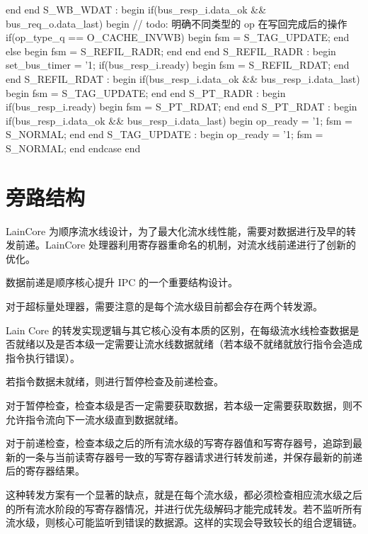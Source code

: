 \begin{CodeBlock}[language=BookSystemVerilog]
        end
      end
      S_WB_WDAT : begin
        if(bus_resp_i.data_ok && bus_req_o.data_last) begin
          // todo: 明确不同类型的 op 在写回完成后的操作
          if(op_type_q == O_CACHE_INVWB) begin
            fsm = S_TAG_UPDATE;
          end
          else begin
            fsm = S_REFIL_RADR;
          end
        end
      end
      S_REFIL_RADR : begin
        set_bus_timer = '1;
        if(bus_resp_i.ready) begin
          fsm       = S_REFIL_RDAT;
        end
      end
      S_REFIL_RDAT : begin
        if(bus_resp_i.data_ok && bus_resp_i.data_last) begin
          fsm = S_TAG_UPDATE;
        end
      end
      S_PT_RADR : begin
        if(bus_resp_i.ready) begin
          fsm = S_PT_RDAT;
        end
      end
      S_PT_RDAT : begin
        if(bus_resp_i.data_ok && bus_resp_i.data_last) begin
          op_ready = '1;
          fsm = S_NORMAL;
        end
      end
      S_TAG_UPDATE : begin
        op_ready = '1;
        fsm = S_NORMAL;
      end
    endcase
  end
\end{CodeBlock}

\section{旁路结构}\label{sec:04-advanced-cpu-024}

LainCore 为顺序流水线设计，为了最大化流水线性能，需要对数据进行及早的转发前递。LainCore 处理器利用寄存器重命名的机制，对流水线前递进行了创新的优化。

数据前递是顺序核心提升 IPC 的一个重要结构设计。

对于超标量处理器，需要注意的是每个流水级目前都会存在两个转发源。

Lain Core 的转发实现逻辑与其它核心没有本质的区别，在每级流水线检查数据是否就绪以及是否本级一定需要让流水线数据就绪（若本级不就绪就放行指令会造成指令执行错误）。

若指令数据未就绪，则进行暂停检查及前递检查。

对于暂停检查，检查本级是否一定需要获取数据，若本级一定需要获取数据，则不允许指令流向下一流水级直到数据就绪。

对于前递检查，检查本级之后的所有流水级的写寄存器值和写寄存器号，追踪到最新的一条与当前读寄存器号一致的写寄存器请求进行转发前递，并保存最新的前递后的寄存器结果。

这种转发方案有一个显著的缺点，就是在每个流水级，都必须检查相应流水级之后的所有流水阶段的写寄存器情况，并进行优先级解码才能完成转发。若不监听所有流水级，则核心可能监听到错误的数据源。这样的实现会导致较长的组合逻辑链。

